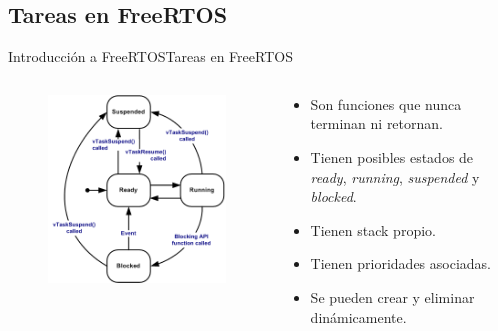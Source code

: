 \documentclass[aspectratio=169, xcolor=dvipsnames]{beamer}
\begin{document}
\subsection{Tareas en FreeRTOS}
\begin{frame}{Introducción a FreeRTOS}{Tareas en FreeRTOS}
\begin{columns}
\begin{column}{0.5\textwidth}
\begin{figure}
\centering
\includegraphics[width=0.8\linewidth]{resources/images/task_states.png}
\end{figure}
\end{column}
\begin{column}{0.5\textwidth}
\begin{itemize}
    \item Son funciones que nunca terminan ni retornan.
    \item Tienen posibles estados de \textit{ready}, \textit{running}, \textit{suspended} y \textit{blocked}.
    \item Tienen stack propio.
    \item Tienen prioridades asociadas.
    \item Se pueden crear y eliminar dinámicamente.
\end{itemize}
\end{column}
\end{columns}
\end{frame}
\end{document}
